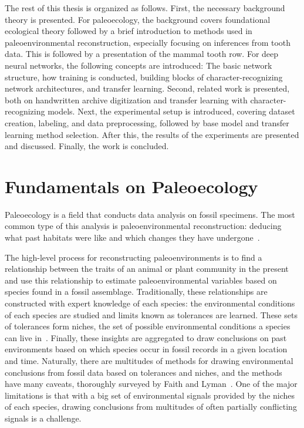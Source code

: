 \documentclass[english,twoside,openright]{UH_DS_MSc}
\begin{document}
The rest of this thesis is organized as follows. First, the necessary background theory is 
presented. For paleoecology, the background covers 
foundational ecological theory followed by a brief introduction to methods used in
paleoenvironmental reconstruction, especially focusing on inferences from tooth data. This is
followed by a presentation of the mammal tooth row.
For deep neural networks, the following concepts are introduced:
The basic network structure, how training is conducted, building blocks of character-recognizing network architectures, and transfer learning. 
Second, related work is presented, both on
handwritten archive digitization and transfer learning with character-recognizing models.
Next, the experimental setup is introduced, covering dataset creation, labeling, and data 
preprocessing, followed by base model and transfer learning method selection. After this, 
the results of the experiments are presented and discussed. Finally, the work is concluded.

\chapter{Fundamentals on Paleoecology}

Paleoecology is a field that conducts data analysis on fossil specimens. The most common type of 
this analysis is paleoenvironmental reconstruction: deducing what past habitats were like and which 
changes they have undergone~\cite{Faith_Lyman_2019_ch2}.

The high-level process for reconstructing paleoenvironments is to find a relationship between the traits of an animal or plant community in the present and use this 
relationship to estimate paleoenvironmental variables based on species found in a fossil assemblage.
Traditionally, these relationships are constructed with expert knowledge of each species: the environmental conditions of
each species are studied and limits known as tolerances are learned. These sets of tolerances form niches,
the set of possible environmental conditions a species can live in~\cite{Faith_Lyman_2019_ch2}. Finally, these insights are aggregated to 
draw conclusions on past environments based on which species occur in fossil records in a given location and time.
Naturally, there are multitudes of methods for drawing environmental conclusions from fossil data based on 
tolerances and niches, and the methods have many caveats, thoroughly surveyed by Faith and Lyman~\cite{Faith_Lyman_2019}. One of the major limitations is that with a big set of environmental signals provided by the niches of each species, drawing conclusions from multitudes of often partially conflicting signals is a challenge.
\end{document}

